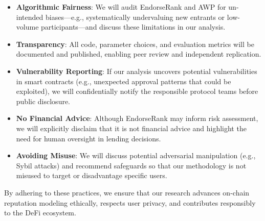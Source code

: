\begin{itemize}
\item[\textbullet] \textbf{Algorithmic Fairness}: We will audit EndorseRank and AWP for un- intended biases---e.g., systematically undervaluing new entrants or low- volume participants---and discuss these limitations in our analysis.
\item[\textbullet] \textbf{Transparency}: All code, parameter choices, and evaluation metrics will be documented and published, enabling peer review and independent replication.
\end{itemize}

\begin{itemize}
\item[\textbullet] \textbf{Vulnerability Reporting}: If our analysis uncovers potential vulnerabilities in smart contracts (e.g., unexpected approval patterns that could be exploited), we will confidentially notify the responsible protocol teams before public disclosure.
\end{itemize}

\begin{itemize}
\item[\textbullet] \textbf{No Financial Advice}: Although EndorseRank may inform risk assessment, we will explicitly disclaim that it is not financial advice and highlight the need for human oversight in lending decisions.
\item[\textbullet] \textbf{Avoiding Misuse}: We will discuss potential adversarial manipulation (e.g., Sybil attacks) and recommend safeguards so that our methodology is not misused to target or disadvantage specific users.
\end{itemize}
By adhering to these practices, we ensure that our research advances on-chain reputation modeling ethically, respects user privacy, and contributes responsibly to the DeFi ecosystem.
